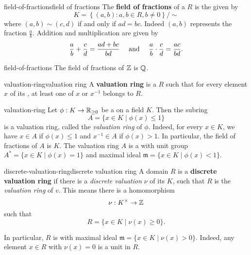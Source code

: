 \begin{topic}{field-of-fractions}{field of fractions}
    The \textbf{field of fractions} of a  $R$ is the  given by
    \[ K = \left\{ (a, b) : a, b \in R, b \ne 0 \right\} / \sim{} \]
    where $(a, b) \sim{} (c, d)$ if and only if $ad = bc$. Indeed $(a, b)$ represents the fraction $\frac{a}{b}$. Addition and multiplication are given by
    \[ \frac{a}{b} + \frac{c}{d} = \frac{ad + bc}{bd} \quad \textup{ and } \quad \frac{a}{b} \cdot \frac{c}{d} = \frac{ac}{bd} . \]
\end{topic}

\begin{example}{field-of-fractions}
    The field of fractions of $\mathbb{Z}$ is $\mathbb{Q}$.
\end{example}

\begin{topic}{valuation-ring}{valuation ring}
    A \textbf{valuation ring} is a  $R$ such that for every element $x$ of its , at least one of $x$ or $x^{-1}$ belongs to $R$.
\end{topic}

\begin{example}{valuation-ring}
    Let $\phi : K \to \mathbb{R}_{\ge 0}$ be a   on a field $K$. Then the subring
    \[ A = \{ x \in K \mid \phi(x) \le 1 \} \]
    is a valuation ring, called the \textit{valuation ring} of $\phi$. Indeed, for every $x \in K$, we have $x \in A$ if $\phi(x) \le 1$ and $x^{-1} \in A$ if $\phi(x) > 1$. In particular, the field of fractions of $A$ is $K$. The valuation ring $A$ is a  with unit group $A^* = \{ x \in K \mid \phi(x) = 1 \}$ and maximal ideal $\mathfrak{m} = \{ x \in K \mid \phi(x) < 1 \}$.
\end{example}

\begin{topic}{discrete-valuation-ring}{discrete valuation ring}
    A domain  $R$ is a \textbf{discrete valuation ring} if there is a \textit{discrete valuation} $\nu$ of its  $K$, such that $R$ is the \textit{valuation ring} of $v$. This means there is a homomorphism
    \[ \nu : K^\times \to \mathbb{Z} \]
    such that
    \[ R = \{ x \in K \mid \nu(x) \ge 0 \} . \]
    
    In particular, $R$ is  with maximal ideal $\mathfrak{m} = \{ x \in K \mid \nu(x) > 0 \}$. Indeed, any element $x \in R$ with $\nu(x) = 0$ is a unit in $R$.
\end{topic}

